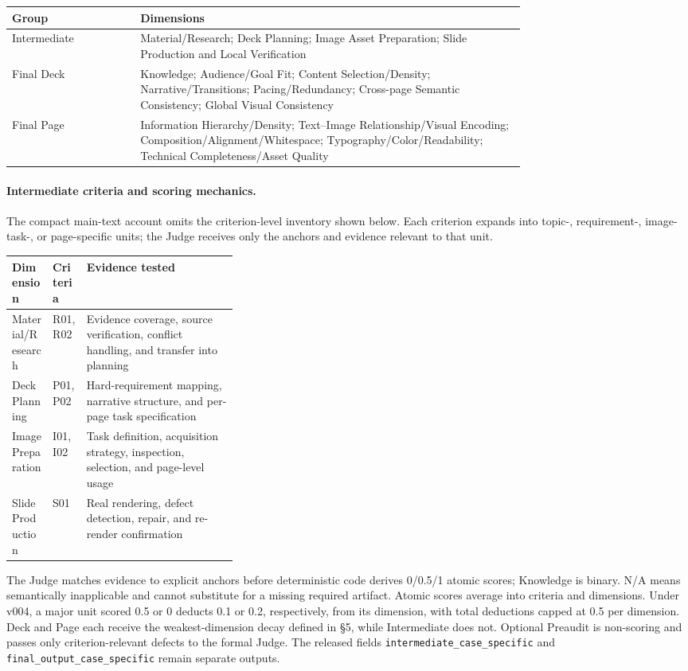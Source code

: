 \begin{center}\small
\begin{tabular}{lp{0.75\linewidth}}
\toprule Group & Dimensions \\
\midrule
Intermediate & Material/Research; Deck Planning; Image Asset Preparation; Slide Production and Local Verification \\
Final Deck & Knowledge; Audience/Goal Fit; Content Selection/Density; Narrative/Transitions; Pacing/Redundancy; Cross-page Semantic Consistency; Global Visual Consistency \\
Final Page & Information Hierarchy/Density; Text--Image Relationship/Visual Encoding; Composition/Alignment/Whitespace; Typography/Color/Readability; Technical Completeness/Asset Quality \\
\bottomrule
\end{tabular}
\end{center}

\paragraph{Intermediate criteria and scoring mechanics.} The compact main-text account omits the
criterion-level inventory shown below. Each criterion expands into topic-, requirement-, image-task-,
or page-specific units; the Judge receives only the anchors and evidence relevant to that unit.

\begin{center}\small
\begin{tabularx}{\linewidth}{@{}p{0.18\linewidth}p{0.15\linewidth}X@{}}
\toprule Dimension & Criteria & Evidence tested \\
\midrule
Material/Research & R01, R02 & Evidence coverage, source verification, conflict handling, and transfer into planning \\
Deck Planning & P01, P02 & Hard-requirement mapping, narrative structure, and per-page task specification \\
Image Preparation & I01, I02 & Task definition, acquisition strategy, inspection, selection, and page-level usage \\
Slide Production & S01 & Real rendering, defect detection, repair, and re-render confirmation \\
\bottomrule
\end{tabularx}
\end{center}

The Judge matches evidence to explicit anchors before deterministic code derives 0/0.5/1 atomic
scores; Knowledge is binary. N/A means semantically inapplicable and cannot substitute for a missing
required artifact. Atomic scores average into criteria and dimensions. Under v004, a major unit scored
0.5 or 0 deducts 0.1 or 0.2, respectively, from its dimension, with total deductions capped at 0.5 per
dimension. Deck and Page each receive the weakest-dimension decay defined in \S5, while Intermediate
does not. Optional Preaudit is non-scoring and passes only criterion-relevant defects to the formal
Judge. The released fields \texttt{intermediate\_case\_specific} and
\texttt{final\_output\_case\_specific} remain separate outputs.

